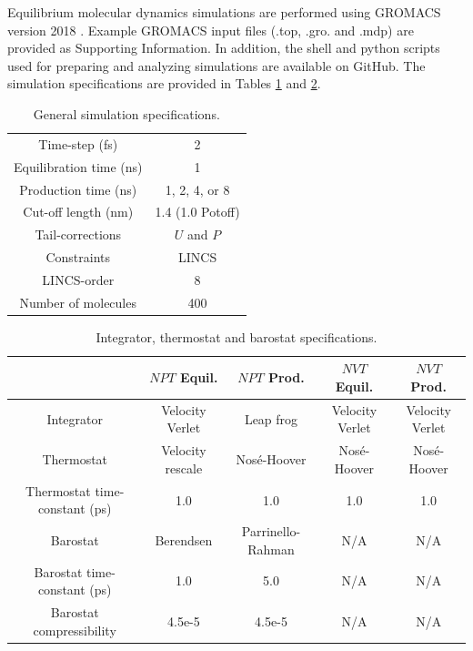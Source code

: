 \documentclass[preprint,review,12pt]{elsarticle}
\begin{document}
	Equilibrium molecular dynamics simulations are performed using GROMACS version 2018 \cite{GROMACS_2018}. Example GROMACS input files (.top, .gro. and .mdp) are provided as Supporting Information. In addition, the shell and python scripts used for preparing and analyzing simulations are available on GitHub. The simulation specifications are provided in Tables \ref{tab:sim_specs} and \ref{tab:thermostats_barostats}.  
	
	\begin{table}[htb!]
		\caption{General simulation specifications.} \label{tab:sim_specs}
		\begin{center}
			\begin{tabular}{|c|c|}
				\hline
				Time-step (fs) & 2 \\
				Equilibration time (ns) & 1 \\
				Production time (ns) & 1, 2, 4, or 8 \\
				Cut-off length (nm) & 1.4 (1.0 Potoff) \\
				Tail-corrections \cite{GROMACS_note} & $U$ and $P$ \\
				Constraints & LINCS \\
				LINCS-order & 8 \\			     
				Number of molecules & 400 \\
				\hline        
			\end{tabular}
		\end{center}
	\end{table}
	
	\begin{table}[h!]
		\caption{Integrator, thermostat and barostat specifications.} \label{tab:thermostats_barostats}
		\begin{center}
			\begin{tabular}{|c|c|c|c|c|}
				\hline
				& $NPT$ Equil. & $NPT$ Prod. & $NVT$ Equil. & $NVT$ Prod. \\ \hline
				Integrator & Velocity Verlet & Leap frog & Velocity Verlet & Velocity Verlet \\ \hline 
				Thermostat & Velocity rescale & Nos{\'e}-Hoover & Nos{\'e}-Hoover & Nos{\'e}-Hoover \\ \hline 
				Thermostat time-constant (ps) & 1.0 & 1.0 & 1.0 & 1.0 \\ \hline
				Barostat & Berendsen & Parrinello-Rahman & N/A & N/A \\ \hline
				Barostat time-constant (ps) & 1.0 & 5.0 & N/A & N/A \\ \hline
				Barostat compressibility & 4.5e-5 & 4.5e-5 & N/A & N/A \\
				\hline
			\end{tabular}
		\end{center} 
	\end{table}
	
\end{document}

